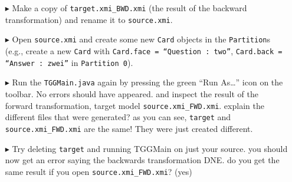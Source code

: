\begin{itemize}
\begin{figure}[htbp]
\begin{center}
  \texttt{[image: eclipse\_TGGRuleBuiltBOX]}
  \caption{our created box}
  \label{fig:derivedBOX}
\end{center}
\end{figure}


mention the graph viewer here! Reemmber the graph view? Its a useful tool, especially with TGGs! Drag and drop \texttt{Box English Numbers} into the graph
viewer. You can see how the partitions are connected via link variables, and you can see which partition contains which card. (Fig.~\ref{fig:graphViewBox}) You
could do this for \texttt{Dictionary} as well, but you'll only have a simple tree graph, with three long lines connecting each entry to the dictionary.

\begin{figure}[htbp]
\begin{center}
  \texttt{[image: eclipse\_EngNumBoxGraphView]}
  \caption{dat graph view. hmmmm.}
  \label{fig:graphViewBox}
\end{center}
\end{figure}


\vspace{0.5cm}

Congratulations! You have successfully performed your first \emph{backward} transformation from your target model (dictionary) to your source (Learning box)
using TGGs! To show that the transformation is actually bidirectional however, lets edit the source model (thus resolving the error from above) and transform it
\emph{forward} to a new target model:


\item[$\blacktriangleright$] Make a copy of \texttt{target.xmi\_BWD.xmi} (the result of the backward transformation)
and rename it to \texttt{source.xmi}.
  
\item[$\blacktriangleright$] Open \texttt{source.xmi} and create some new \texttt{Card} objects in the \texttt{Partition}s (e.g., create a new \texttt{Card}
with \texttt{Card.face = ``Question : two''}, \texttt{Card.back = ``Answer : zwei''} in \texttt{Partition 0}).

\item[$\blacktriangleright$] Run the \texttt{TGGMain.java} again by pressing the green ``Run As\ldots'' icon on the toolbar. No errors should have appeared. and
inspect the result of the forward transformation, target model \texttt{source.xmi\_FWD.xmi}. explain the different files that were generated? as you can see,
\texttt{target} and \texttt{source.xmi\_FWD.xmi} are the same! They were just created different.

\item[$\blacktriangleright$] Try deleting \texttt{target} and running TGGMain on just your source. you should now get an error saying the backwards
transformation DNE. do you get the same result if you open \texttt{source.xmi\_FWD.xmi}? (yes)

\end{itemize}
